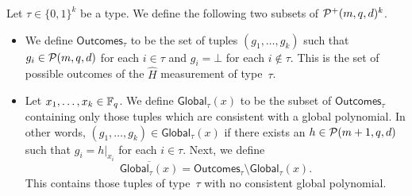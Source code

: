 \begin{definition}
Let $\tau \in \{0, 1\}^k$ be a type.
We define the following two subsets of $\mathcal{P}^+(m,q,d)^k$.
\begin{itemize}
\item
We define $\mathsf{Outcomes}_{\tau}$ to be the set of tuples $(g_1, \ldots, g_k)$ such that $g_i  \in \mathcal{P}(m, q, d)$ for each $i \in \tau$ and $g_i = \bot$ for each $i \notin \tau$.
This is the set of possible outcomes of the $\widehat{H}$ measurement of type~$\tau$.
\item
Let $x_1, \ldots, x_k \in \mathbb F_q$.
We define $\mathsf{Global}_{\tau}(x)$ to be the subset of $\mathsf{Outcomes}_{\tau}$ containing only those tuples which are consistent with a global polynomial. In other words, $(g_1, \ldots, g_k) \in \mathsf{Global}_{\tau}(x)$ if there exists an $h \in \mathcal{P}(m+1, q, d)$ such that $g_i = h|_{x_i}$ for each $i \in \tau$.
Next, we define
\begin{equation*}
\overline{\mathsf{Global}_{\tau}(x)} = \mathsf{Outcomes}_{\tau} \setminus \mathsf{Global}_{\tau}(x).
\end{equation*}
This contains those tuples of type~$\tau$ with no consistent global polynomial.
\end{itemize}
\end{definition}


